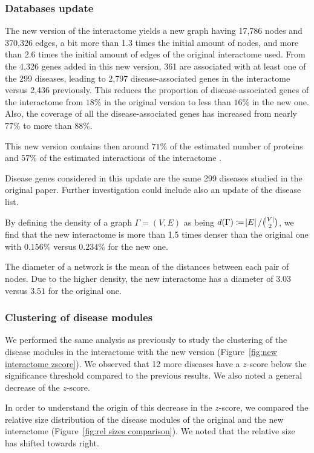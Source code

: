 \documentclass[letterpaper]{article}
\begin{document}
		\subsubsection{Databases update}
		The new version of the interactome yields a new graph having 17,786 nodes and 370,326 edges, a bit more
		than 1.3 times the initial amount of nodes, and more than 2.6 times the initial amount of edges of the
		original interactome used. From the 4,326 genes added in this new version, 361 are associated with at
		least one of the 299 diseases, leading to 2,797 disease-associated genes in the interactome versus 2,436
		previously. This reduces the proportion of disease-associated genes of the interactome from $18\%$ in
		the original version to less than $16\%$ in the new one. Also, the coverage of all the disease-associated
		genes has increased from nearly $77\%$ to more than $88\%$.

		This new version contains then around $71\%$ of the estimated number of proteins and $57\%$ of the
		estimated interactions of the interactome \citep{estimatingTheSizeOfTheHumanInteractome,ATruerMeasureOfOurIgnorance}.

		Disease genes considered in this update are the same 299 diseases studied in the original paper.
		Further investigation could include also an update of the disease list.

		By defining the density of a graph $\Gamma = (V, E)$ as being $d(\Gamma) \coloneqq \abs E/\binom {\abs V}2$,
		we find that the new interactome is more than 1.5 times denser than the original one with $0.156\%$ versus $0.234\%$
		for the new one.

		The diameter of a network is the mean of the distances between each pair of nodes. Due to the higher density,
		the new interactome has a diameter of $3.03$ versus $3.51$ for the original one.

	\subsubsection{Clustering of disease modules}
	We performed the same analysis as previously to study the clustering of the disease modules in the
	interactome with the new version (Figure~\ref{fig:new interactome zscore}). We observed that 12 more
	diseases have a $z$-score below the significance threshold compared to the previous results. We also
	noted a general decrease of the $z$-score.

	In order to understand the origin of this decrease in the $z$-score, we compared the relative size
	distribution of the disease modules of the original and the new interactome
	(Figure~\ref{fig:rel sizes comparison}). We noted that the relative size has shifted towards right.
\end{document}
